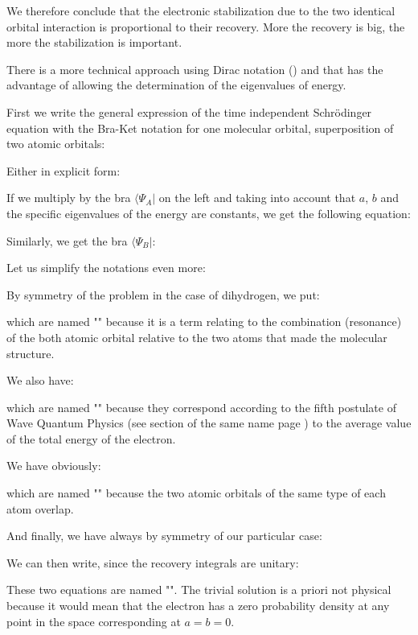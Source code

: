 	We therefore conclude that the electronic stabilization due to the two identical orbital interaction is proportional to their recovery. More the recovery is big, the more the stabilization is important.
	
	There is a more technical approach using Dirac notation () and that has the advantage of allowing the determination of the eigenvalues of energy.

	First we write the general expression of the time independent Schrödinger equation with the Bra-Ket notation for one molecular orbital, superposition of two atomic orbitals:
	
	Either in explicit form:
	
	If we multiply by the bra $\langle \Psi_A|$  on the left and taking into account that $a$, $b$ and the specific eigenvalues of the energy are constants, we get the following equation:
	
	Similarly, we get the bra $\langle \Psi_B|$:
	
	Let us simplify the notations even more:
	
	By symmetry of the problem in the case of dihydrogen, we put:
	
	which are named "" because it is a term relating to the combination (resonance) of the both atomic orbital relative to the two atoms that made the molecular structure.

	We also have:
	
	which are named "" because they correspond according to the fifth postulate of Wave Quantum Physics (see section of the same name page \pageref{fifth postulate of wave quantum physics}) to the average value of the total energy of the electron.

	We have obviously:
	
	which are named "" because the two atomic orbitals of the same type of each atom overlap.
	
	And finally, we have always by symmetry of our particular case:
	
	We can then write, since the recovery integrals are unitary:
	
	These two equations are named "". The trivial solution is a priori not physical because it would mean that the electron has a zero probability density at any point in the space corresponding at $a=b=0$.

